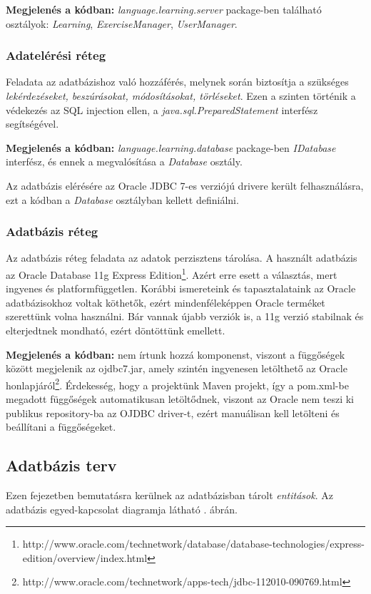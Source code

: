\documentclass[11pt, a4paper]{article}
\begin{document}
    \textbf{Megjelenés a kódban:} \textit{language.learning.server} package-ben található osztályok: \textsl{Learning}, \textsl{ExerciseManager}, \textsl{UserManager}.
    
    \subsubsection{Adatelérési réteg}
    Feladata az adatbázishoz való hozzáférés, melynek során biztosítja a szükséges \textit{lekérdezéseket, beszúrásokat, módosításokat, törléseket}. Ezen a szinten történik a védekezés az SQL injection ellen, a \textit{java.sql.PreparedStatement} interfész segítségével.
    
    \textbf{Megjelenés a kódban:} \textit{language.learning.database} package-ben \textsl{IDatabase} interfész, és ennek a megvalósítása a \textsl{Database} osztály.
    
    Az adatbázis elérésére az Oracle JDBC 7-es verziójú drivere került felhasználásra, ezt a kódban a \textsl{Database} osztályban kellett definiálni.
    
    \subsubsection{Adatbázis réteg}
    Az adatbázis réteg feladata az adatok perzisztens tárolása. A használt adatbázis az Oracle Database 11g Express Edition\footnote{http://www.oracle.com/technetwork/database/database-technologies/express-edition/overview/index.html}. Azért erre esett a választás, mert ingyenes és platformfüggetlen. Korábbi ismereteink és tapasztalataink az Oracle adatbázisokhoz voltak köthetők, ezért mindenféleképpen Oracle terméket szerettünk volna használni. Bár vannak újabb verziók is, a 11g verzió stabilnak és elterjedtnek mondható, ezért döntöttünk emellett.
    
   \textbf{ Megjelenés a kódban:} nem írtunk hozzá komponenst, viszont a függőségek között megjelenik az ojdbc7.jar, amely szintén ingyenesen letölthető az Oracle honlapjáról\footnote{http://www.oracle.com/technetwork/apps-tech/jdbc-112010-090769.html}. Érdekesség, hogy a projektünk Maven projekt, így a pom.xml-be megadott függőségek automatikusan letöltődnek, viszont az Oracle nem teszi ki publikus repository-ba az OJDBC driver-t, ezért manuálisan kell letölteni és beállítani a függőségeket.
    
    \subsection{Adatbázis terv}
    Ezen fejezetben bemutatásra kerülnek az adatbázisban tárolt \emph{entitások}. Az adatbázis egyed-kapcsolat diagramja látható . ábrán.
    
\end{document}
